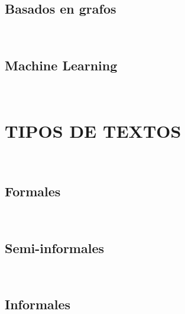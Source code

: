 \subsection{Basados en grafos}
\blindtext\\
\subsection{Machine Learning}
\blindtext\\


\section{TIPOS DE TEXTOS}
\blindtext\\
\subsection{Formales}
\blindtext\\
\subsection{Semi-informales}
\blindtext\\
\subsection{Informales}
\blindtext\\
